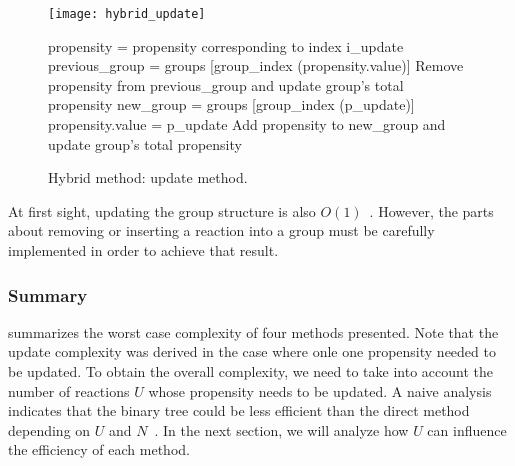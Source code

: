 \begin{figure}[!h]
  \centering
  \begin{minipage}{\textwidth}
    \centering
    \texttt{[image: hybrid\_update]}
    \begin{algorithm}[H]
      \SetAlgoLined
      \KwData{$K+1$ groups, group k containing propensities whose value falls in the interval $(0,b]$ if k=0, $(2^{k-1}b, 2^kb]$ if k $>$ 0. Propensities are stored as a couple containing their value and original index. Index i\_update of propensity to update, new propensity value p\_update.}
  propensity = propensity corresponding to index i\_update\;
  previous\_group = groups [group\_index (propensity.value)]\;
  Remove propensity from previous\_group and update group's total propensity\;
  new\_group = groups [group\_index (p\_update)]\;
  propensity.value = p\_update\;
  Add propensity to new\_group and update group's total propensity\;
    \end{algorithm}
  \end{minipage}
  \caption{Hybrid method: update method.}
  \label{fig:hybrid_update}
\end{figure}

At first sight, updating the group structure is also $O(1)$~. However, the parts about removing or inserting a reaction into a group must be carefully implemented in order to achieve that result.

\subsubsection {Summary}

 summarizes the worst case complexity of four methods presented. Note that the update complexity was derived in the case where onle one propensity needed to be updated. To obtain the overall complexity, we need to take into account the number of reactions $U$ whose propensity needs to be updated. A naive analysis indicates that the binary tree could be less efficient than the direct method depending on $U$ and $N$~. In the next section, we will analyze how $U$ can influence the efficiency of each method.

